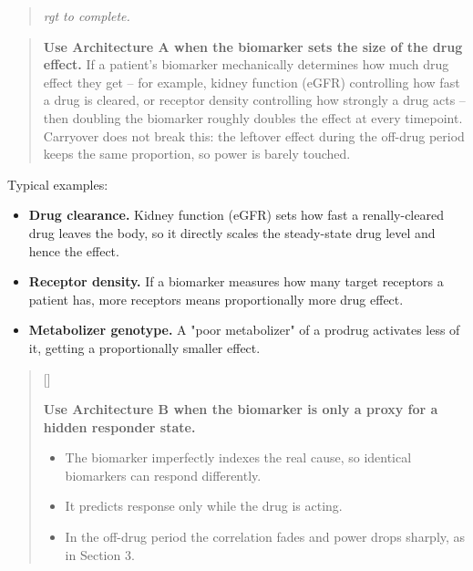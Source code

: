 \documentclass[
  11pt,
]{article}
\newcounter{pgraph}
\newenvironment{bullets}{%
  \stepcounter{pgraph}%
  \begin{quote}\small\sffamily\color[gray]{0.30}%
  {\normalfont\scriptsize\color[gray]{0.58}[\thepgraph]\enspace}}{%
  \end{quote}}
\newenvironment{rgt}{%
  \begin{quote}\small\itshape\color[RGB]{20,60,160}}{%
  \end{quote}}
\newenvironment{orig}{%
  \begin{quote}\normalsize\color[gray]{0.55}}{%
  \end{quote}}
\begin{document}
\begin{rgt}
rgt to complete.

\end{rgt}

\begin{orig}
\textbf{Use Architecture A when the biomarker sets the size of the
drug effect.} If a patient's biomarker mechanically determines how much
drug effect they get -- for example, kidney function (eGFR) controlling
how fast a drug is cleared, or receptor density controlling how strongly
a drug acts -- then doubling the biomarker roughly doubles the effect at
every timepoint. Carryover does not break this: the leftover effect
during the off-drug period keeps the same proportion, so power is barely
touched.

\end{orig}

Typical examples:

\begin{itemize}
\item \textbf{Drug clearance.} Kidney function (eGFR) sets how fast a
  renally-cleared drug leaves the body, so it directly scales the
  steady-state drug level and hence the effect.
\item \textbf{Receptor density.} If a biomarker measures how many
  target receptors a patient has, more receptors means
  proportionally more drug effect.
\item \textbf{Metabolizer genotype.} A "poor metabolizer" of a
  prodrug activates less of it, getting a proportionally smaller
  effect.
\end{itemize}

\begin{bullets}

\textbf{Use Architecture B when the biomarker is only a proxy for a
hidden responder state.}

\begin{itemize}\setlength{\itemsep}{2pt}\setlength{\parskip}{0pt}
\item The biomarker imperfectly indexes the real cause, so identical
biomarkers can respond differently.
\item It predicts response only while the drug is acting.
\item In the off-drug period the correlation fades and power drops sharply, as
in Section 3.
\end{itemize}

\end{bullets}
\end{document}
